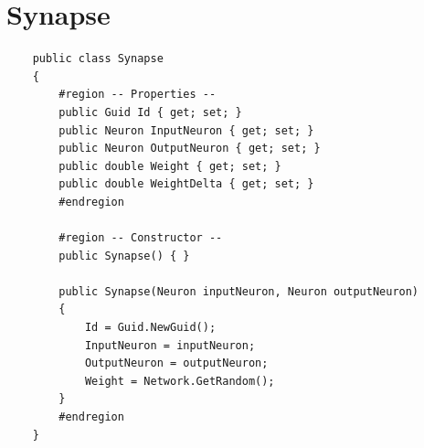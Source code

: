 \documentclass[12pt,a4paper]{article}
\begin{document}
	\section*{Synapse}
	\begin{lstlisting}
	public class Synapse
	{
		#region -- Properties --
		public Guid Id { get; set; }
		public Neuron InputNeuron { get; set; }
		public Neuron OutputNeuron { get; set; }
		public double Weight { get; set; }
		public double WeightDelta { get; set; }
		#endregion

		#region -- Constructor --
		public Synapse() { }

		public Synapse(Neuron inputNeuron, Neuron outputNeuron)
		{
			Id = Guid.NewGuid();
			InputNeuron = inputNeuron;
			OutputNeuron = outputNeuron;
			Weight = Network.GetRandom();
		}
		#endregion
	}
	\end{lstlisting}
	
\end{document}
